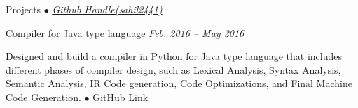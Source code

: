 \documentclass{resume} %
\begin{document}
\begin{rSection}{Projects {$\bullet$} \emph{\href{http://www.github.com/sahil2441}{\footnotesize Github Handle(sahil2441)}}}

\begin{rSubsection}{Compiler for Java type language} {\emph {Feb. 2016 -- May 2016}}{}{}
\item Designed and build a compiler in Python for Java type language that includes different phases of compiler design, such as  
Lexical Analysis, Syntax Analysis, Semantic Analysis, IR Code generation, Code Optimizations, and Final Machine Code Generation.
{\tiny$\bullet$}
\href{https://github.com/sahil2441/Compiler}{GitHub Link} 
\end{rSubsection}








\end{rSection}
\end{document}
